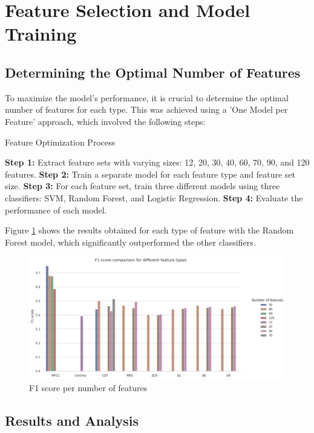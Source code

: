 \section{Feature Selection and Model Training}

\subsection{Determining the Optimal Number of Features}

To maximize the model's performance, it is crucial to determine the optimal number of features for each type. This was achieved using a 'One Model per Feature' approach, which involved the following steps:

\begin{algorithm}
    \caption{Feature Optimization Process}
    \begin{algorithmic}[1]
        \State \textbf{Step 1:} Extract feature sets with varying sizes: 12, 20, 30, 40, 60, 70, 90, and 120 features.
        \State \textbf{Step 2:} Train a separate model for each feature type and feature set size.
        \State \textbf{Step 3:} For each feature set, train three different models using three classifiers: SVM, Random Forest, and Logistic Regression.
        \State \textbf{Step 4:} Evaluate the performance of each model.
    \end{algorithmic}
    \end{algorithm}

Figure \ref{fig:n_feature_per_type} shows the results obtained for each type of feature with the Random Forest model, which significantly outperformed the other classifiers.

\begin{figure}[htbp]
    \centering
    \includegraphics[width=.8\textwidth]{../images/n_feature_per_type.png}
    \caption{F1 score per number of features}
    \label{fig:n_feature_per_type}
\end{figure}

\subsection{Results and Analysis}

